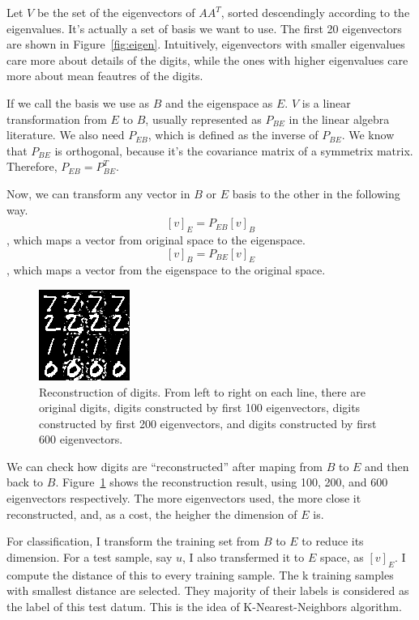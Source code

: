 \documentclass[10pt]{article}
\begin{document}
Let $V$ be the set of the eigenvectors of $AA^T$, sorted descendingly
according to the eigenvalues. It's actually a set of basis we want to
use. The first 20 eigenvectors are shown in Figure~\ref{fig:eigen}.
Intuitively, eigenvectors with smaller eigenvalues care more about
details of the digits, while the ones with higher eigenvalues care
more about mean feautres of the digits.

If we call the basis we use as $B$ and the eigenspace as $E$. $V$
is a linear transformation from $E$ to $B$, usually represented as
$P_{BE}$ in the linear algebra literature. We also need $P_{EB}$,
which is defined as the inverse of $P_{BE}$. We know that $P_{BE}$ is
orthogonal, because it's the covariance matrix of a symmetrix matrix.
Therefore, $P_{EB} = P_{BE}^T$.

Now, we can transform any vector in $B$ or $E$ basis to the other in
the following way.
$$[v]_E = P_{EB} [v]_B$$, which maps a vector from original space to
the eigenspace.
$$[v]_B = P_{BE} [v]_E$$, which maps a vector from the eigenspace to
the original space.

\begin{figure}
\centering
\includegraphics[]{test.png}
\caption{Reconstruction of digits. From left to right on each line,
there are original digits, digits constructed by first 100
eigenvectors, digits constructed by first 200 eigenvectors, and digits
constructed by first 600 eigenvectors. }
\label{fig:test}
\end{figure}

We can check how digits are ``reconstructed'' after maping from $B$ to
$E$ and then back to $B$. Figure~\ref{fig:test} shows the
reconstruction result, using 100, 200, and 600 eigenvectors
respectively. The more eigenvectors used, the more close it
reconstructed, and, as a cost, the heigher the dimension of $E$ is.

For classification, I transform the training set from $B$ to $E$ to
reduce its dimension. For a test sample, say $u$, I also transfermed
it to $E$ space, as $[v]_E$. I compute the distance of this to every
training sample. The k training samples with smallest distance are
selected. They majority of their labels is considered as the label of
this test datum. This is the idea of K-Nearest-Neighbors algorithm.
\end{document}
